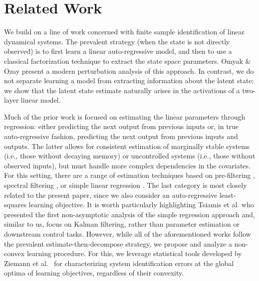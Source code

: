 \documentclass[11pt]{article}
\renewcommand{\cite}{\citep}
\newcommand{\<}{\langle}
\renewcommand{\>}{\rangle}
\numberwithin{equation}{section}
\begin{document}
\section{Related Work}\label{sec:relatedwork}

We build on a line of work concerned with finite sample identification of linear dynamical systems.
The prevalent strategy (when the state is not directly observed)
is to first learn a linear auto-regressive model, and then to use a classical factorization technique \cite{ho1966effective} to extract the state space parameters. Omyak \& Ozay
\cite{oymak2021revisiting} present a modern perturbation analysis of this approach.  
In contrast, we do not separate learning a model from extracting information about the latent state; we show that the latent state estimate naturally arises in the activations of a two-layer linear model.

Much of the prior work is focused on estimating the linear parameters through regression:
either predicting the next output from previous inputs \cite{oymak2018non,sun2022finite, sarkar2021finite} or, in true auto-regressive fashion,
predicting the next output from previous inputs and outputs.
The latter allows for consistent estimation of marginally stable systems (i.e., those without decaying memory) or uncontrolled systems (i.e., those without observed inputs), 
but must handle more complex dependencies in the covariates.
For this setting, there are a range of estimation techniques based on pre-filtering \cite{simchowitz2019learning,bakshi2023new}, spectral filtering \cite{dogariu2025universal}, 
or simple linear regression \cite{tsiamis2019finite,lale2020logarithmic, lee2020non}.
The last category is most closely related to the present paper,
since we also consider an auto-regressive least-squares learning objective. It is worth particularly highlighting Tsiamis et al. \cite{tsiamis2019finite} who presented the first non-asymptotic analysis of the simple regression approach and, similar to us, focus on Kalman filtering, rather than parameter estimation or downstream control tasks.
However, 
while all of the aforementioned works follow the prevalent estimate-then-decompose strategy, we propose and analyze a non-convex learning procedure.
For this, we leverage statistical tools developed by Ziemann et al.~\cite{ziemann2022single,ziemann2022learning} for characterizing system identification errors at the global optima of learning objectives, regardless of their convexity. 
\end{document}
